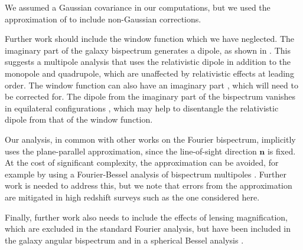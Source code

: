 We assumed a Gaussian covariance in our computations, but we used the approximation  of \cite{Chan:2016ehg} to include non-Gaussian corrections. 

Further work should include the window function which we have  neglected.
The imaginary part of the galaxy bispectrum generates a dipole, as shown in \cite{Clarkson:2018dwn}. This suggests a multipole analysis that uses the relativistic dipole in addition to the monopole and quadrupole, {which are unaffected by relativistic effects at leading order.} The
window function can also have an imaginary part \cite{Beutler:2018vpe}, which will need to be corrected for. The dipole from the imaginary part of the bispectrum vanishes in equilateral configurations \cite{Clarkson:2018dwn}, which may help to disentangle the relativistic dipole from that of the window function.

{Our analysis, in common with other works on the Fourier bispectrum, implicitly uses the plane-parallel approximation, since the line-of-sight direction ${\bm{n}}$ is fixed. At the cost of significant complexity, the approximation can be avoided, for example by using a Fourier-Bessel analysis of bispectrum multipoles \cite{Castorina:2017inr}. Further work is needed to address this, but we note that errors from the approximation are mitigated in high redshift surveys such as the one considered here.}

Finally, further work also needs to include the effects of lensing magnification, which are excluded in the standard Fourier analysis, but have been included in the galaxy angular bispectrum \cite{Kehagias:2015tda,DiDio:2015bua, DiDio:2016gpd, DiDio:2018unb} and in a spherical Bessel analysis \cite{Bertacca:2017dzm}. 
